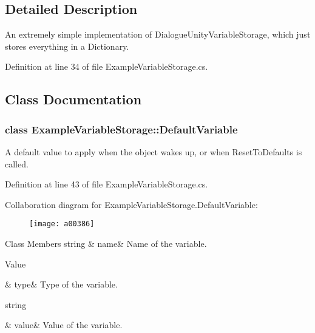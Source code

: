 \subsection{Detailed Description}
An extremely simple implementation of Dialogue\-Unity\-Variable\-Storage, which just stores everything in a Dictionary. 

Definition at line 34 of file Example\-Variable\-Storage.\-cs.



\subsection{Class Documentation}
\label{a00376}
\hypertarget{a00089_a00376}{}
\subsubsection{class Example\-Variable\-Storage\-:\-:Default\-Variable}
A default value to apply when the object wakes up, or when Reset\-To\-Defaults is called. 

Definition at line 43 of file Example\-Variable\-Storage.\-cs.



Collaboration diagram for Example\-Variable\-Storage.\-Default\-Variable\-:
\nopagebreak
\begin{figure}[H]
\begin{center}
\leavevmode
\texttt{[image: a00386]}
\end{center}
\end{figure}
\begin{DoxyFields}{Class Members}
\hypertarget{a00089_a609feaa53936e7dc42248ff2ba68454a}{string}\label{a00089_a609feaa53936e7dc42248ff2ba68454a}
&
name&
Name of the variable. \\
\hline

\hypertarget{a00089_a904347efdca12f40243c7dedb646153d}{Value}\label{a00089_a904347efdca12f40243c7dedb646153d}
&
type&
Type of the variable. \\
\hline

\hypertarget{a00089_a0f00ecb21b58aa754a4bbb61edf62818}{string}\label{a00089_a0f00ecb21b58aa754a4bbb61edf62818}
&
value&
Value of the variable. \\
\hline

\end{DoxyFields}


